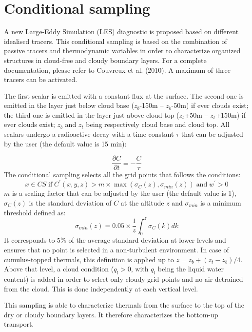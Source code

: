 \section{Conditional sampling}
%
A new Large-Eddy Simulation (LES) diagnostic is proposed based on different idealised tracers. This conditional sampling is based on the combination of passive tracers and thermodynamic variables in order to characterize organized structures in cloud-free and cloudy boundary layers. For a complete documentation, please refer to Couvreux et al. (2010). %
A maximum of three tracers can be activated.

The first scalar is emitted with a constant flux at the surface. The second one is emitted in the layer just below cloud base ($z_b$-150m -- $z_b$-50m) if ever clouds exist; the third one is emitted in the layer just above cloud top ($z_t$+50m -- $z_t$+150m) if ever clouds exist; $z_b$ and $z_t$ being respectively cloud base and cloud top.  All scalars undergo a radioactive decay with a time constant $\tau$ that can be adjusted by the user (the default value is 15 min):

\begin{equation}
\frac{\partial C}{\partial t}=- \frac{C}{\tau}
\end{equation}
The conditional sampling selects all the grid points that follows the conditions:
\begin{equation}
x \in CS \;\mbox{if}\; C^{'}(x,y,z) > m \times \max(\sigma_{C}(z),\sigma_{min}(z)) \;\mbox{and}\; w^{'}>0
\end{equation}
$m$ is a scaling factor that can be adjusted by the user (the default value is 1),
$\sigma_{C}(z)$ is the standard deviation of $C$ at the altitude $z$ and
$\sigma_{min}$ is a minimum threshold defined as:
\begin{equation}
\sigma_{min}(z)=0.05 \times \frac{1}{z} \int_0^z \sigma_{C}(k) dk
\end{equation}
It corresponds to 5\% of the average standard deviation at lower levels and ensures that no point is selected in a non-turbulent environment.
In case of cumulus-topped thermals, this definition is applied up to $z=z_b+(z_t-z_b)/4$. Above that level, a cloud condition ($q_l>0$, with $q_l$ being the liquid water content) is added in order to select only cloudy grid points and no air detrained from the cloud.
This is done independently at each vertical level.

This sampling is able to characterize thermals from the surface to the top of the dry or cloudy boundary layers. It therefore characterizes the bottom-up transport. 

